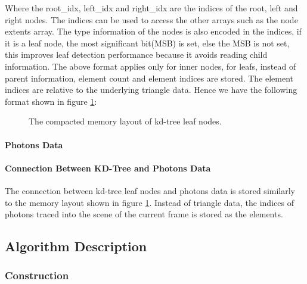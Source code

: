 Where the root\_idx, left\_idx and right\_idx are the indices of the root, left and right nodes. The indices can be used to access the other arrays such as the node extents array. The type information of the nodes is also encoded in the indices, if it is a leaf node, the most significant bit(MSB) is set, else the MSB is not set, this improves leaf detection performance because it avoids reading child information. The above format applies only for inner nodes, for leafs, instead of parent information, element count and element indices are stored. The element indices are relative to the underlying triangle data. Hence we have the following format shown in figure \ref{fig:kdtree_leaf_memory_layout}:

\begin{figure}[htp]
    \centering
    \renewcommand{\thefigure}{\thechapter.\arabic{figure}}
    \caption[Compacted memory layout of kd-tree leaf nodes]{The compacted memory layout of kd-tree leaf nodes.}
    \label{fig:kdtree_leaf_memory_layout}
\end{figure}

\paragraph{Photons Data}

\paragraph{Connection Between KD-Tree and Photons Data}

The connection between kd-tree leaf nodes and photons data is stored similarly to the memory layout shown in figure \ref{fig:kdtree_leaf_memory_layout}. Instead of triangle data, the indices of photons traced into the scene of the current frame is stored as the elements.


\subsection{Algorithm Description}

\subsubsection{Construction}


